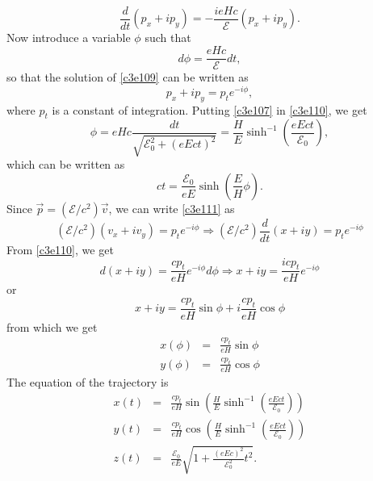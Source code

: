 \begin{enumerate}
\begin{equation}
\frac{d}{dt}(p_x + ip_y) = -\frac{ieHc}{\mathcal{E}}(p_x + ip_y).
\end{equation}
Now introduce a variable $\phi$ such that
\begin{equation}\label{c3e111}
d\phi = \frac{eHc}{\mathcal{E}}dt,
\end{equation}
so that the solution of \eqref{c3e109} can be written as
\begin{equation}\label{c3e112}
p_x + ip_y = p_t e^{-i\phi},
\end{equation}
where $p_t$ is a constant of integration. Putting \eqref{c3e107} in \eqref{c3e110},
we get
\begin{equation}\label{c3e113}
\phi = eHc\frac{dt}{\sqrt{\mathcal{E}_0^2 + (eEct)^2}} = \frac{H}{E}\sinh^{-1}
\left(\frac{eEct}{\mathcal{E}_0}\right),
\end{equation}
which can be written as
\begin{equation}\label{c3e114}
ct = \frac{\mathcal{E}_0}{eE}\sinh\left(\frac{E}{H}\phi\right).
\end{equation}
Since $\vec{p} = (\mathcal{E}/c^2)\vec{v}$, we can write \eqref{c3e111} as
\[
(\mathcal{E}/c^2)(v_x + iv_y) = p_t e^{-i\phi} \Rightarrow 
(\mathcal{E}/c^2)\frac{d}{dt}(x + iy) = p_te^{-i\phi}
\]
From \eqref{c3e110}, we get
\[
d(x + iy) = \frac{cp_t}{eH}e^{-i\phi}d\phi \Rightarrow x + iy = \frac{icp_t}{eH}e^{-i\phi}
\]
or
\[
x + iy = \frac{cp_t}{eH}\sin\phi + i\frac{cp_t}{eH}\cos\phi
\]
from which we get
\begin{eqnarray}
x(\phi) &=& \frac{cp_t}{eH}\sin\phi \label{c3e115} \\
y(\phi) &=& \frac{cp_t}{eH}\cos\phi \label{c3e116}
\end{eqnarray}
The equation of the trajectory is
\begin{eqnarray}
x(t) &=& \frac{cp_t}{eH}\sin\left(\frac{H}{E}\sinh^{-1}\left(\frac{eEct}{\mathcal{E}_0}\right)\right) \label{c3e117} \\
y(t) &=& \frac{cp_t}{eH}\cos\left(\frac{H}{E}\sinh^{-1}\left(\frac{eEct}{\mathcal{E}_0}\right)\right) \label{c3e118} \\
z(t) &=& \frac{\mathcal{E}_0}{eE}\sqrt{1 + \frac{(eEc)^2}{\mathcal{E}_0^2}t^2}. \label{c3e119}
\end{eqnarray}
\end{enumerate}

